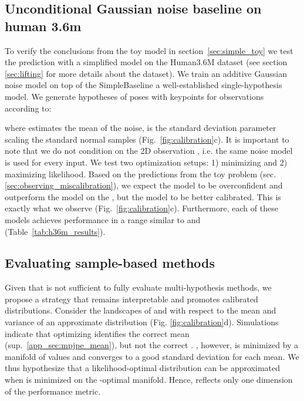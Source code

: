 \documentclass{article} \usepackage{iclr2023_conference,times}
\begin{document}
    \subsection{Unconditional Gaussian noise baseline on human 3.6m}
    To verify the conclusions from the toy model in section~\ref{sec:simple_toy} we test the prediction with a simplified model on the Human3.6M dataset  \citep{IonescuSminchisescu11, h36m_pami} (see section \ref{sec:lifting} for more details about the dataset).
    We train an additive Gaussian noise model on top of the SimpleBaseline \citep{martinez_2017_3dbaseline} a well-established single-hypothesis model.
    We generate  hypotheses  of poses with  keypoints for  observations  according to:
    
    where  estimates the mean of the noise,  is the standard deviation parameter scaling the standard normal samples  (Fig.~\ref{fig:calibration}c).
    It is important to note that we do not condition  on the 2D observation , i.e. the same noise model is used for every input.
    We test two optimization setups: 1) minimizing  and 2) maximizing likelihood.
    Based on the predictions from the toy problem (sec. \ref{sec:observing_miscalibration}), we expect the  model to be overconfident and outperform the  model on the , but the  model to be better calibrated. 
    This is exactly what we observe (Fig.~\ref{fig:calibration}c).
    Furthermore, each of these models achieves  performance in a range similar to \citet{Sharma_Varigonda_Bindal_Sharma_Jain_2019} and \citet{Wehrbein_Rudolph_Rosenhahn_Wandt_2021} (Table~\ref{tab:h36m_results}).
    
    \subsection{Evaluating sample-based methods}
    Given that  is not sufficient to fully evaluate multi-hypothesis methods, we propose a strategy that remains interpretable and promotes calibrated distributions.
    Consider the landscapes of  and  with respect to the mean and variance of an approximate distribution (Fig. \ref{fig:calibration}d). Simulations indicate that optimizing  identifies the correct mean  (sup.~\ref{app_sec:mpjpe_mean}), but not  the correct . 
    , however, is minimized by a manifold of  values and converges to a good standard deviation for each mean.
    We thus hypothesize that a likelihood-optimal distribution can be approximated when  is minimized on the -optimal manifold.
    Hence,  reflects only one dimension of the performance metric.
\end{document}
